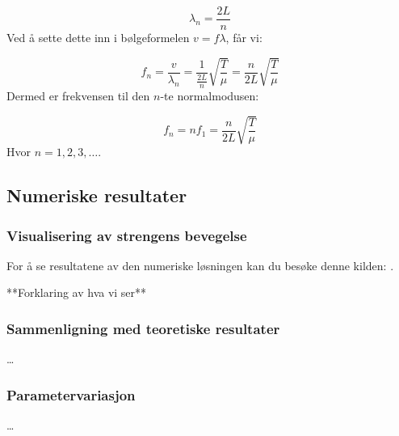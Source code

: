 \begin{equation*}
    \lambda_n = \frac{2L}{n}
\end{equation*}
Ved å sette dette inn i bølgeformelen $v = f \lambda$, får vi:

\begin{equation*}
    f_n = \frac{v}{\lambda_n} = \frac{1}{\frac{2L}{n}} \sqrt{\frac{T}{\mu}} = \frac{n}{2L} \sqrt{\frac{T}{\mu}}
\end{equation*}
Dermed er frekvensen til den $n$-te normalmodusen:

\begin{equation*}
    f_n = n f_1 = \frac{n}{2L} \sqrt{\frac{T}{\mu}}
\end{equation*}
Hvor $n = 1, 2, 3, \ldots$.




\subsection{Numeriske resultater}
\subsubsection{Visualisering av strengens bevegelse}
For å se resultatene av den numeriske løsningen kan du besøke denne kilden: \parencite{}.

{\color{red}**Forklaring av hva vi ser**}


\subsubsection{Sammenligning med teoretiske resultater}
\dots

\subsubsection{Parametervariasjon}
\dots